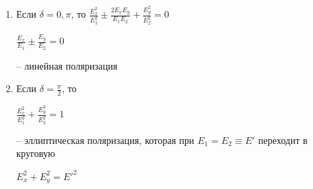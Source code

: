 \documentclass[10pt,pdf,hyperref={unicode}, dvipsnames, handout]{beamer}
\begin{document}

\begin{frame}
		\begin{enumerate}
		\item Если $\delta=0, \pi$, то
		$\frac{E_x^2}{E_1^2}\pm\frac{2E_xE_y}{E_1E_2}+\frac{E_y^2}{E_2^2}=0$\\
		\begin{center}
			$\frac{E_x}{E_1}\pm\frac{E_y}{E_2}=0$\\
		\end{center}
		-- линейная поляризация
		\item Если $\delta=\frac{\pi}{2}$, то\\
		\begin{center}
			$\frac{E_x^2}{E_1^2}+\frac{E_y^2}{E_2^2}=1$\\
		\end{center}
		-- эллиптическая поляризация, которая при $E_1=E_2 \equiv E'$ переходит в круговую
		\begin{center}
			$E_x^2+E_y^2=E'^2$\\
		\end{center}
		\end{enumerate}		
\end{frame}
\end{document}
